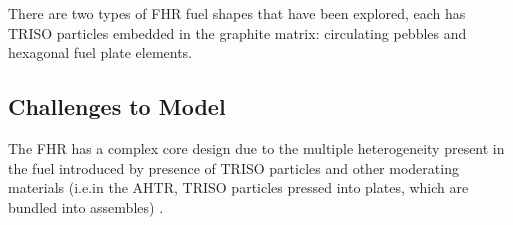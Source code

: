 There are two types of \gls{FHR} fuel shapes that have been explored, 
each has \gls{TRISO} particles embedded in the graphite matrix: circulating 
pebbles and hexagonal fuel plate elements. 


\subsection{Challenges to Model}
The \gls{FHR} has a complex core design due to the multiple heterogeneity present 
in the fuel introduced by presence of \gls{TRISO} particles and other moderating 
materials (i.e.in the \gls{AHTR}, \gls{TRISO} particles pressed into plates, which 
are bundled into assembles) \cite{ramey_monte_2018,rahnema_phenomena_2019}.

